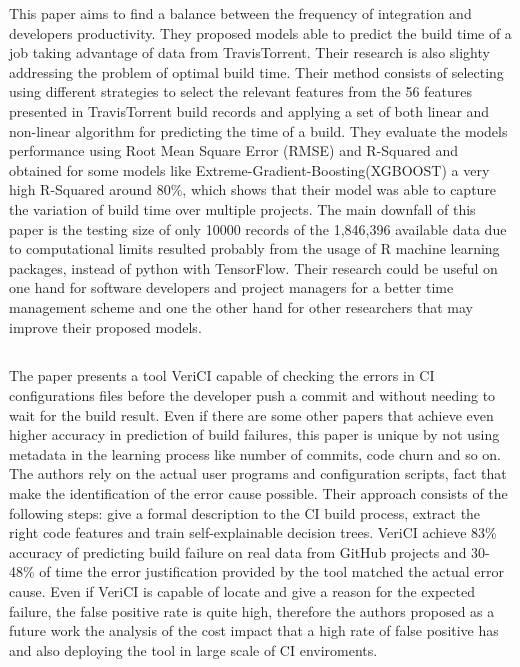 \documentclass[]{book}
\begin{document}
This paper aims to find a balance between the frequency of integration
and developers productivity. They proposed models able to predict the
build time of a job taking advantage of data from TravisTorrent. Their
research is also slighty addressing the problem of optimal build time.
Their method consists of selecting using different strategies to select
the relevant features from the 56 features presented in TravisTorrent
build records and applying a set of both linear and non-linear algorithm
for predicting the time of a build. They evaluate the models performance
using Root Mean Square Error (RMSE) and R-Squared and obtained for some
models like Extreme-Gradient-Boosting(XGBOOST) a very high R-Squared
around 80\%, which shows that their model was able to capture the
variation of build time over multiple projects. The main downfall of
this paper is the testing size of only 10000 records of the 1,846,396
available data due to computational limits resulted probably from the
usage of R machine learning packages, instead of python with TensorFlow.
Their research could be useful on one hand for software developers and
project managers for a better time management scheme and one the other
hand for other researchers that may improve their proposed models.

\subsection{\texorpdfstring{\citet{santolucito2018statically}}{@santolucito2018statically}}\label{santolucito2018statically}

The paper presents a tool VeriCI capable of checking the errors in CI
configurations files before the developer push a commit and without
needing to wait for the build result. Even if there are some other
papers that achieve even higher accuracy in prediction of build
failures, this paper is unique by not using metadata in the learning
process like number of commits, code churn and so on. The authors rely
on the actual user programs and configuration scripts, fact that make
the identification of the error cause possible. Their approach consists
of the following steps: give a formal description to the CI build
process, extract the right code features and train self-explainable
decision trees. VeriCI achieve 83\% accuracy of predicting build failure
on real data from GitHub projects and 30-48\% of time the error
justification provided by the tool matched the actual error cause. Even
if VeriCI is capable of locate and give a reason for the expected
failure, the false positive rate is quite high, therefore the authors
proposed as a future work the analysis of the cost impact that a high
rate of false positive has and also deploying the tool in large scale of
CI enviroments.
\end{document}
